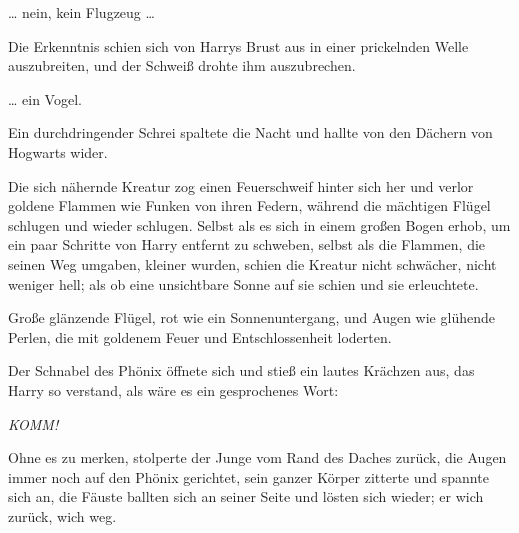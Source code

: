 … nein, kein Flugzeug …

Die Erkenntnis schien sich von Harrys Brust aus in einer prickelnden Welle auszubreiten, und der Schweiß drohte ihm auszubrechen.

… ein Vogel.

Ein durchdringender Schrei spaltete die Nacht und hallte von den Dächern von Hogwarts wider.

Die sich nähernde Kreatur zog einen Feuerschweif hinter sich her und verlor goldene Flammen wie Funken von ihren Federn, während die mächtigen Flügel schlugen und wieder schlugen. Selbst als es sich in einem großen Bogen erhob, um ein paar Schritte von Harry entfernt zu schweben, selbst als die Flammen, die seinen Weg umgaben, kleiner wurden, schien die Kreatur nicht schwächer, nicht weniger hell; als ob eine unsichtbare Sonne auf sie schien und sie erleuchtete.

Große glänzende Flügel, rot wie ein Sonnenuntergang, und Augen wie glühende Perlen, die mit goldenem Feuer und Entschlossenheit loderten.

Der Schnabel des Phönix öffnete sich und stieß ein lautes Krächzen aus, das Harry so verstand, als wäre es ein gesprochenes Wort:

\emph{KOMM!}

Ohne es zu merken, stolperte der Junge vom Rand des Daches zurück, die Augen immer noch auf den Phönix gerichtet, sein ganzer Körper zitterte und spannte sich an, die Fäuste ballten sich an seiner Seite und lösten sich wieder; er wich zurück, wich weg.

